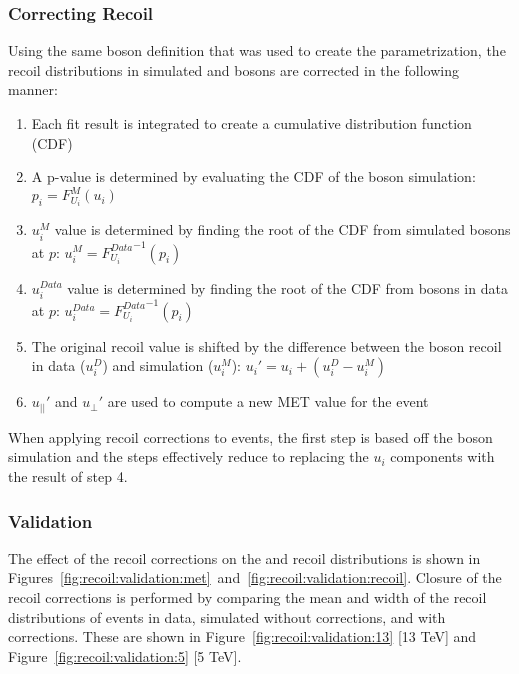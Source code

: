 \subsubsection{Correcting Recoil} \label{ch10:recoil:apply}
Using the same boson \pt definition that was used to create the parametrization, the recoil distributions in simulated \W and \Z bosons are corrected in the following manner: 
\begin{enumerate}
    \item Each fit result is integrated to create a cumulative distribution function (CDF)
    \item A p-value is determined by evaluating the CDF of the \W boson simulation: $p_{i}=F_{U_{i}}^{M}(u_{i})$
    \item $u_i^{M}$ value is determined by finding the root of the CDF from simulated \Z bosons at $p$: $u_{i}^{M}={F_{U_{i}}^{Data}}^{-1}(p_{i})$
    \item $u_i^{Data}$ value is determined  by finding the root of the CDF from \Z bosons in data at $p$: $u_{i}^{Data}={F_{U_{i}}^{Data}}^{-1}(p_{i})$
    \item The original recoil value is shifted by the difference between the \Z boson recoil in data ($u_i^D$) and simulation ($u_i^M$):  $u_{i}' = u_{i} + (u_i^D - u_i^M) $
    \item $u_{||}'$ and $u_{\perp}'$ are used to compute a new MET value for the event
\end{enumerate}
When applying recoil corrections to \zll events, the first step is based off the \Z boson simulation and the steps effectively reduce to replacing the $u_{i}$ components with the result of step 4. 

\subsubsection{Validation}
The effect of the recoil corrections on the \zmm \met and recoil distributions is shown in Figures~\ref{fig:recoil:validation:met}~and~\ref{fig:recoil:validation:recoil}. Closure of the recoil corrections is performed by comparing the mean and width of the recoil distributions of \zll events in data, simulated \zll without corrections, and \zll with corrections. These are shown in Figure~\ref{fig:recoil:validation:13} [13 TeV] and Figure~\ref{fig:recoil:validation:5} [5 TeV].







